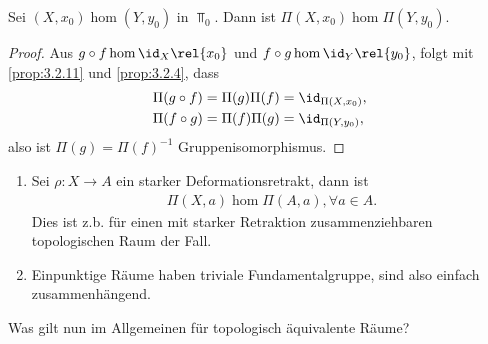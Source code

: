 \begin{cor}
\label{prop:3.2.12}
Sei $(X,x_0)\hom (Y,y_0)$ in $\Top_0$. Dann ist $\Pi(X,x_0) \hom
\Pi(Y,y_0)$.\fishhere
\end{cor}
\begin{proof}
Aus $g\circ f\hom\id_X\rel{x_0}$ und $f\circ g\hom\id_Y\rel{y_0}$, folgt mit
\ref{prop:3.2.11} und \ref{prop:3.2.4}, dass
\begin{align*}
&\Pi(g\circ f) = \Pi(g)\Pi(f) = \id_{\Pi(X,x_0)},\\
&\Pi(f\circ g) = \Pi(f)\Pi(g) = \id_{\Pi(Y,y_0)},
\end{align*}
also ist $\Pi(g) = \Pi(f)^{-1}$ Gruppenisomorphismus.\qedhere
\end{proof}

\begin{bsp}
\label{bsp:3.2.13}
\begin{enumerate}[label=\arabic{*}.)]
  \item 
Sei $\rho: X\to A$ ein starker Deformationsretrakt, dann ist
\begin{align*}
\Pi(X,a)\hom\Pi(A,a), \forall a\in A.
\end{align*}
Dies ist z.b. für einen mit starker Retraktion zusammenziehbaren
topologischen Raum der Fall.
\item
Einpunktige Räume haben triviale Fundamentalgruppe, sind also
einfach zusammenhängend.\bsphere
\end{enumerate}
\end{bsp}

Was gilt nun im Allgemeinen für topologisch äquivalente Räume?

